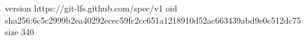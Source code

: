version https://git-lfs.github.com/spec/v1
oid sha256:6c5c2999b2ea40292ecec59fc2cc651a1218910d52ac663439abd9e0c512dc75
size 340
